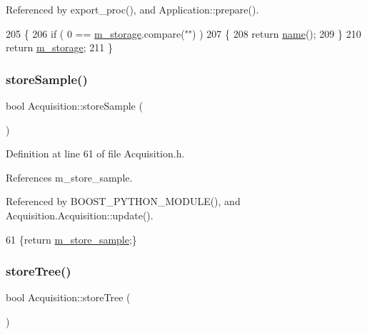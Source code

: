 Referenced by export\+\_\+proc(), and Application\+::prepare().


\begin{DoxyCode}
205                        \{
206     \textcolor{keywordflow}{if} ( 0 == \hyperlink{classProcessus_a132b1e71f72327e5a87f0a168c7b6325}{m\_storage}.compare(\textcolor{stringliteral}{""}) )
207     \{
208       \textcolor{keywordflow}{return} \hyperlink{classObject_a300f4c05dd468c7bb8b3c968868443c1}{name}();
209     \}
210     \textcolor{keywordflow}{return} \hyperlink{classProcessus_a132b1e71f72327e5a87f0a168c7b6325}{m\_storage};
211   \}
\end{DoxyCode}
\mbox{\label{classAcquisition_a9af304e0fb2076cd4f92703708efe83e}} 
\subsubsection{\texorpdfstring{store\+Sample()}{storeSample()}}
{\footnotesize\ttfamily bool Acquisition\+::store\+Sample (\begin{DoxyParamCaption}{ }\end{DoxyParamCaption})\hspace{0.3cm}{\ttfamily [inline]}}



Definition at line 61 of file Acquisition.\+h.



References m\+\_\+store\+\_\+sample.



Referenced by B\+O\+O\+S\+T\+\_\+\+P\+Y\+T\+H\+O\+N\+\_\+\+M\+O\+D\+U\+L\+E(), and Acquisition.\+Acquisition\+::update().


\begin{DoxyCode}
61 \{\textcolor{keywordflow}{return} \hyperlink{classAcquisition_a987cc1d04007cf1f5acc1accfd0909e5}{m\_store\_sample};\}
\end{DoxyCode}
\mbox{\label{classAcquisition_a8ab7e58ccb3fee54eb6850e5081fae10}} 
\subsubsection{\texorpdfstring{store\+Tree()}{storeTree()}}
{\footnotesize\ttfamily bool Acquisition\+::store\+Tree (\begin{DoxyParamCaption}{ }\end{DoxyParamCaption})\hspace{0.3cm}{\ttfamily [inline]}}



